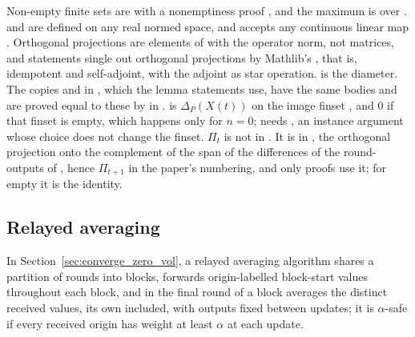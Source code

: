 Non-empty finite sets are  with a nonemptiness proof , and the maximum is  over .  and  are defined on any real normed space, and  accepts any continuous linear map . Orthogonal projections are elements of  with the operator norm, not matrices, and statements single out orthogonal projections by Mathlib's , that is, idempotent and self-adjoint, with the adjoint as star operation.  is the diameter. The copies  and  in , which the lemma statements use, have the same bodies and are proved equal to these by  in .  is $\Delta_P(X(t))$ on the image finset , and $0$ if that finset is empty, which happens only for $n=0$;  needs \lean{[DecidableEq V]}, an instance argument whose choice does not change the finset. $\Pi_t$ is not in . It is  in , the orthogonal projection onto the complement of the span of the differences of the round- outputs of , hence $\Pi_{t+1}$ in the paper's numbering, and only proofs use it; for empty  it is the identity.

\subsection{Relayed averaging}\label{app:lean-relaying}

In Section~\ref{sec:converge_zero_vol}, a relayed averaging algorithm shares a partition of rounds into blocks, forwards origin-labelled block-start values throughout each block, and in the final round of a block averages the distinct received values, its own included, with outputs fixed between updates; it is $\alpha$-safe if every received origin has weight at least $\alpha$ at each update.

